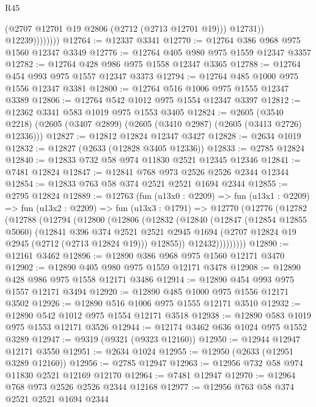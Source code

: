 \begin{lexlean}{R45}
\begin{coremodule}
                        (@2707 @12701 @19 @2806 (@2712 (@2713 @12701 @19)))
                        @12731))
                    @12239))))))))
@12764 := @12337 @3341
@12770 := @12764 @386 @968 @975 @1560 @12347 @3349
@12776 := @12764 @405 @980 @975 @1559 @12347 @3357
@12782 := @12764 @428 @986 @975 @1558 @12347 @3365
@12788 := @12764 @454 @993 @975 @1557 @12347 @3373
@12794 := @12764 @485 @1000 @975 @1556 @12347 @3381
@12800 := @12764 @516 @1006 @975 @1555 @12347 @3389
@12806 := @12764 @542 @1012 @975 @1554 @12347 @3397
@12812 := @12362 @3341 @583 @1019 @975 @1553 @3405
@12824 := @2605
    (@3540 @2218)
    (@2605 (@3407 @2899) (@2605 (@3410 @2987) (@2605 (@3413 @2726) @12336)))
@12827 := @12812 @12824 @12347 @3427
@12828 := @2634 @1019
@12832 := @12827 (@2633 (@12828 @3405 @12336))
@12833 := @2785 @12824
@12840 := @12833 @732 @58 @974 @11830 @2521 @12345 @12346
@12841 := @7481 @12824
@12847 := @12841 @768 @973 @2526 @2526 @2344 @12344
@12854 := @12833 @763 @58 @374 @2521 @2521 @1694 @2344
@12855 := @2795 @12824
@12889 := @12763
    (fun (u13x0 : @2209) =>
    fun (u13x1 : @2209) =>
    fun (u13x2 : @2209) =>
    fun (u13x3 : @1791) =>
    @12770
      (@12776
        (@12782
          (@12788
            (@12794
              (@12800
                (@12806
                  (@12832
                    (@12840
                      (@12847
                        (@12854 @12855 @5060)
                        (@12841
                          @396
                          @374
                          @2521
                          @2521
                          @2945
                          @1694
                          (@2707 @12824 @19 @2945 (@2712 (@2713 @12824 @19)))
                          @12855))
                      @12432)))))))))
@12890 := @12161 @3462
@12896 := @12890 @386 @968 @975 @1560 @12171 @3470
@12902 := @12890 @405 @980 @975 @1559 @12171 @3478
@12908 := @12890 @428 @986 @975 @1558 @12171 @3486
@12914 := @12890 @454 @993 @975 @1557 @12171 @3494
@12920 := @12890 @485 @1000 @975 @1556 @12171 @3502
@12926 := @12890 @516 @1006 @975 @1555 @12171 @3510
@12932 := @12890 @542 @1012 @975 @1554 @12171 @3518
@12938 := @12890 @583 @1019 @975 @1553 @12171 @3526
@12944 := @12174 @3462 @636 @1024 @975 @1552 @3289
@12947 := @9319 (@9321 (@9323 @12160))
@12950 := @12944 @12947 @12171 @3550
@12951 := @2634 @1024
@12955 := @12950 (@2633 (@12951 @3289 @12160))
@12956 := @2785 @12947
@12963 := @12956 @732 @58 @974 @11830 @2521 @12169 @12170
@12964 := @7481 @12947
@12970 := @12964 @768 @973 @2526 @2526 @2344 @12168
@12977 := @12956 @763 @58 @374 @2521 @2521 @1694 @2344

\end{coremodule}
\end{lexlean}
